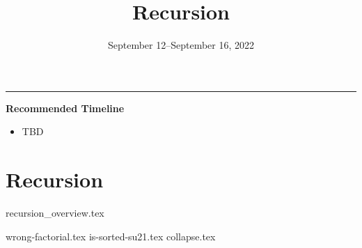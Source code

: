 \documentclass{exam}
\title{Recursion}
\date{September 12--September 16, 2022}
\begin{document}
\maketitle
\rule{\textwidth}{0.15em}
\fontsize{12}{15}\selectfont

\begin{meta}
\textbf{Recommended Timeline}
\begin{itemize}
    \item TBD
\end{itemize}
\end{meta}

\section{Recursion}
{recursion_overview.tex}
\begin{questions}
    {wrong-factorial.tex}
    {is-sorted-su21.tex}
    {collapse.tex}
\end{questions}
\end{document}
